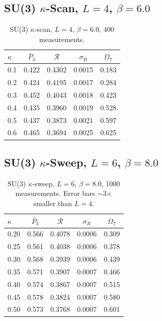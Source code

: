 \documentclass[12pt,a4paper]{article}
\newcommand{\R}{\mathcal{R}}           %
\theoremstyle{plain}
\theoremstyle{definition}
\theoremstyle{remark}
\begin{document}
\subsection{SU(3) $\kappa$-Scan, $L=4$, $\beta=6.0$}

\begin{table}[H]
\centering
\begin{tabular}{lcccc}
\toprule
$\kappa$ & $\bar{P}_3$ & $\R$ & $\sigma_R$ & $\Omega_7$ \\
\midrule
0.1 & 0.422 & 0.4302 & 0.0015 & 0.183 \\
0.2 & 0.424 & 0.4195 & 0.0017 & 0.284 \\
0.3 & 0.452 & 0.4043 & 0.0018 & 0.423 \\
0.4 & 0.435 & 0.3960 & 0.0019 & 0.528 \\
0.5 & 0.437 & 0.3873 & 0.0021 & 0.597 \\
0.6 & 0.465 & 0.3694 & 0.0025 & 0.625 \\
\bottomrule
\end{tabular}
\caption{SU(3) $\kappa$-scan, $L=4$, $\beta=6.0$, 400 measurements.}
\label{tab:su3_kscan_L4}
\end{table}

\subsection{SU(3) $\kappa$-Sweep, $L=6$, $\beta=8.0$}

\begin{table}[H]
\centering
\begin{tabular}{lcccc}
\toprule
$\kappa$ & $\bar{P}_3$ & $\R$ & $\sigma_R$ & $\Omega_7$ \\
\midrule
0.20 & 0.566 & 0.4078 & 0.0006 & 0.309 \\
0.25 & 0.561 & 0.4038 & 0.0006 & 0.378 \\
0.30 & 0.568 & 0.3939 & 0.0006 & 0.439 \\
0.35 & 0.571 & 0.3907 & 0.0007 & 0.466 \\
0.40 & 0.574 & 0.3867 & 0.0007 & 0.515 \\
0.45 & 0.578 & 0.3824 & 0.0007 & 0.580 \\
0.50 & 0.573 & 0.3768 & 0.0007 & 0.601 \\
\bottomrule
\end{tabular}
\caption{SU(3) $\kappa$-sweep, $L=6$, $\beta=8.0$, 1000 measurements.
Error bars $\sim$3$\times$ smaller than $L=4$.}
\label{tab:su3_ksweep_L6}
\end{table}
\end{document}
